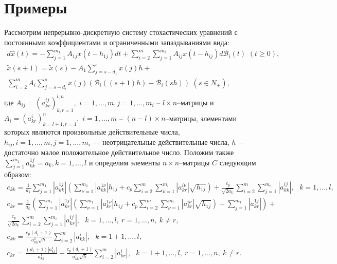 \section{Примеры}\label{kri-s3}
 Рассмотрим непрерывно-дискретную систему
стохастических уравнений с постоянными коэффициентами и
ограниченными запаздываниями вида:
\begin{equation}\label{kri-10}
\begin {array}{crl}
 d\hat x(t) = - \sum
 \limits_{j=1}^{m_1}A_{1j}x(t - h_{1j})dt +
 \sum \limits_{i=2}^m\sum \limits_{j=1}^{m_i}
 A_{ij}x(t - h_{ij})d\mathcal B_i(t) \, \, (t \ge 0),\\
\tilde x(s+1) = \tilde x(s) - A_{1}\sum \limits _{j=s -d_1 }^{s}
x(j)h + \\
\sum \limits _{i=2}^{m}A_{i}\sum \limits _{j=s-d_i}^{s}
x(j)(\mathcal B_i((s+1)h) - \mathcal B_i(sh))\, \,  (s
\in N_+),\\
\end {array}
\end{equation}
где  $A_{ij}=(a^{ij}_{kr})_{k,r=1}^{l,n}, \,\,i = 1,...,m, j =
1,...,m_i$ -- $l \times n$--матрицы и $A_i =
(a^i_{kr})_{k=l+1,r=1}^n, \,\,i = 1,...,m$ -- $(n-l)\times
n$--матрицы, элементами которых являются произвольные действительные
числа,  $h_{ij}, i = 1,...,m, j = 1,...,m_i$ --- неотрицательные
действительные числа, $h$ --- достаточно малое положительное
действительное число. Положим также $\sum \limits_{j=1}^{m_1}
a^{1j}_{kk} = a_k, k = 1,...,l$ и определим элементы $n\times
n$--матрицы $C$ следующим образом:
$$
\begin{array}{crl}
c_{kk}  = \frac{1}{a _k }\sum \limits_{j =1}^{m_1}
|a^{1j}_{kk}|\left(\sum \limits_{\nu=1}^{m_1} |a^{1\nu}_{kk}|h _{1j}
+ c_p\sum \limits_{i=2}^m \sum \limits_{\nu=1}^{m_i}
|a^{i\nu}_{kr}|\sqrt{h_{1j}}\right ) + \frac{c_p}{\sqrt{2a_k }}\sum
\limits_{i=2}^m \sum \limits_{j=1}^{m_i}|a^{ij}_{kk}|, \ \ \ k = 1,...,l,\\
c_{kr} = \frac{1}{a _k }\left(\sum \limits_{j
=1}^{m_1}|a^{1j}_{kr}|\left(\sum
\limits_{\nu=1}^{m_1}|a^{1\nu}_{kr}| h_{1j} +  c_p\sum
\limits_{i=2}^m \sum \limits_{\nu=1}^{m_i}
|a^{i\nu}_{kr}|\sqrt{h_{1j}}\right ) + \sum \limits_{j=1}^{m_1}
|a^{1j}_{kr}|\right )+ \\
\frac{c_p}{\sqrt{2a_k }}\sum \limits_{i=2}^m \sum
\limits_{j=1}^{m_i} |a^{ij}_{kr}|,  \ \ \ k =
1,...,l, \ r = 1, ..., n, \ k \neq r,\\
 c_{kk} = \frac{c_p(d_i+1)}{a^1_{kk}\sqrt{h}}
\sum\limits _{i=2}^{m}|a^{i}_{kk}|, \ \ \ k = 1 + 1,...,l, \\
c_{kr} = \frac{(d_1 + 1)|a^{1}_{kr}|}{a^1_{kk}}
+\frac{c_p(d_i+1)}{a^1_{kk}\sqrt{h}} \sum\limits
_{i=2}^{m}|a^{i}_{kr}|, \ \ \ k = 1 + 1,...,l, \ r = 1, ..., n, \ k
\neq r.
\end {array}
$$

